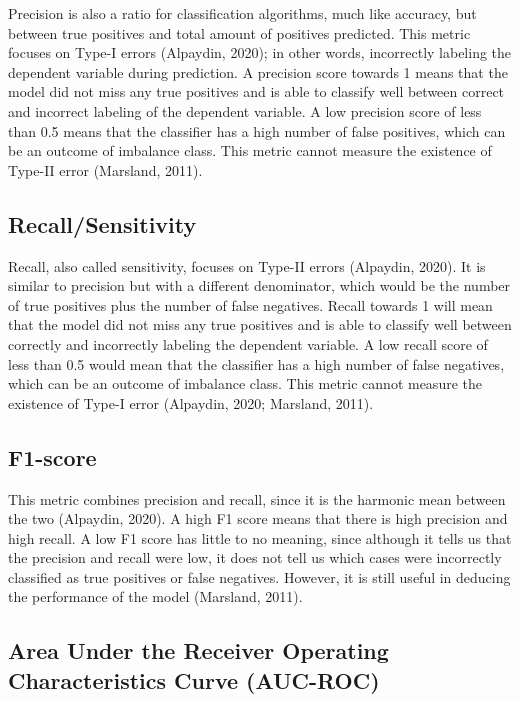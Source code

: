 \documentclass[
  man]{apa7}
\begin{document}
Precision is also a ratio for classification algorithms, much like accuracy, but between true positives and total amount of positives predicted.
This metric focuses on Type-I errors (Alpaydin, 2020); in other words, incorrectly labeling the dependent variable during prediction.
A precision score towards 1 means that the model did not miss any true positives and is able to classify well between correct and incorrect labeling of the dependent variable.
A low precision score of less than 0.5 means that the classifier has a high number of false positives, which can be an outcome of imbalance class.
This metric cannot measure the existence of Type-II error (Marsland, 2011).

\hypertarget{recallsensitivity}{%
\subsection{Recall/Sensitivity}\label{recallsensitivity}}

Recall, also called sensitivity, focuses on Type-II errors (Alpaydin, 2020).
It is similar to precision but with a different denominator, which would be the number of true positives plus the number of false negatives.
Recall towards 1 will mean that the model did not miss any true positives and is able to classify well between correctly and incorrectly labeling the dependent variable.
A low recall score of less than 0.5 would mean that the classifier has a high number of false negatives, which can be an outcome of imbalance class.
This metric cannot measure the existence of Type-I error (Alpaydin, 2020; Marsland, 2011).

\hypertarget{f1-score}{%
\subsection{F1-score}\label{f1-score}}

This metric combines precision and recall, since it is the harmonic mean between the two (Alpaydin, 2020).
A high F1 score means that there is high precision and high recall.
A low F1 score has little to no meaning, since although it tells us that the precision and recall were low, it does not tell us which cases were incorrectly classified as true positives or false negatives.
However, it is still useful in deducing the performance of the model (Marsland, 2011).

\hypertarget{area-under-the-receiver-operating-characteristics-curve-auc-roc}{%
\subsection{Area Under the Receiver Operating Characteristics Curve (AUC-ROC)}\label{area-under-the-receiver-operating-characteristics-curve-auc-roc}}
\end{document}
